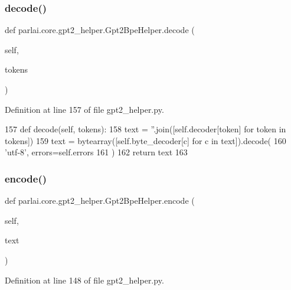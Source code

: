 \subsubsection{\texorpdfstring{decode()}{decode()}}
{\footnotesize\ttfamily def parlai.\+core.\+gpt2\+\_\+helper.\+Gpt2\+Bpe\+Helper.\+decode (\begin{DoxyParamCaption}\item[{}]{self,  }\item[{}]{tokens }\end{DoxyParamCaption})}



Definition at line 157 of file gpt2\+\_\+helper.\+py.


\begin{DoxyCode}
157     \textcolor{keyword}{def }decode(self, tokens):
158         text = \textcolor{stringliteral}{''}.join([self.decoder[token] \textcolor{keywordflow}{for} token \textcolor{keywordflow}{in} tokens])
159         text = bytearray([self.byte\_decoder[c] \textcolor{keywordflow}{for} c \textcolor{keywordflow}{in} text]).decode(
160             \textcolor{stringliteral}{'utf-8'}, errors=self.errors
161         )
162         \textcolor{keywordflow}{return} text
163 
\end{DoxyCode}
\mbox{\label{classparlai_1_1core_1_1gpt2__helper_1_1Gpt2BpeHelper_a7c5c94aa8d5acd15215cf3e45fc9f2c3}} 
\subsubsection{\texorpdfstring{encode()}{encode()}}
{\footnotesize\ttfamily def parlai.\+core.\+gpt2\+\_\+helper.\+Gpt2\+Bpe\+Helper.\+encode (\begin{DoxyParamCaption}\item[{}]{self,  }\item[{}]{text }\end{DoxyParamCaption})}



Definition at line 148 of file gpt2\+\_\+helper.\+py.


